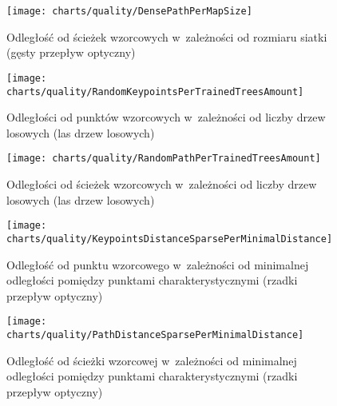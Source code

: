       \begin{figure}[!ht]
        \centering
        \texttt{[image: charts/quality/DensePathPerMapSize]}
        \caption[Odległość od ścieżek wzorcowych w~zależności od rozmiaru siatki]
                {Odległość od ścieżek wzorcowych w~zależności od rozmiaru siatki (gęsty przepływ optyczny)}
        \label{fig:DensePathPerMapSize}
      \end{figure}

    \newpage
      \begin{figure}[!ht]
        \centering
        \texttt{[image: charts/quality/RandomKeypointsPerTrainedTreesAmount]}
        \caption[Odległości od punktów wzorcowych w~zależności od liczby drzew losowych]
                {Odległości od punktów wzorcowych w~zależności od liczby drzew losowych (las drzew losowych)}
        \label{fig:RandomKeypointsPerTrainedTreesAmount}
      \end{figure}

      \begin{figure}[!ht]
        \centering
        \texttt{[image: charts/quality/RandomPathPerTrainedTreesAmount]}
        \caption[Odległości od ścieżek wzorcowych w~zależności od liczby drzew losowych]
                {Odległości od ścieżek wzorcowych w~zależności od liczby drzew losowych (las drzew losowych)}
        \label{fig:RandomPathPerTrainedTreesAmount}
      \end{figure}

    \newpage
      \begin{figure}[!ht]
        \centering
        \texttt{[image: charts/quality/KeypointsDistanceSparsePerMinimalDistance]}
        \caption[Odległość od punktu wzorcowego w~zależności od minimalnej odległości pomiędzy punktami
                 charakterystycznymi]
                {Odległość od punktu wzorcowego w~zależności od minimalnej odległości pomiędzy punktami
                 charakterystycznymi (rzadki przepływ optyczny)}
        \label{fig:SpecialisedSparseKeypointsDistance}
      \end{figure}

      \begin{figure}[!ht]
        \centering
        \texttt{[image: charts/quality/PathDistanceSparsePerMinimalDistance]}
        \caption[Odległość od ścieżki wzorcowej w~zależności od minimalnej odległości pomiędzy punktami
                 charakterystycznymi]
                {Odległość od ścieżki wzorcowej w~zależności od minimalnej odległości pomiędzy punktami
                 charakterystycznymi (rzadki przepływ optyczny)}
        \label{fig:SpecialisedSparsePathDistance}
      \end{figure}

